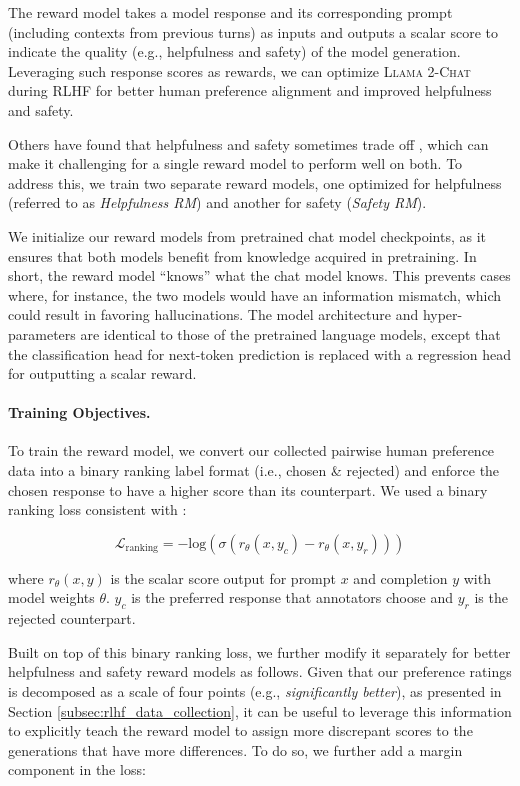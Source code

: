 The reward model takes a model response and its corresponding prompt (including contexts from previous turns) as inputs and outputs a scalar score to indicate the quality (e.g., helpfulness and safety) of the model generation. Leveraging such response scores as rewards, we can optimize \textsc{Llama 2-Chat} during RLHF for better human preference alignment and improved helpfulness and safety. 

Others have found that helpfulness and safety sometimes trade off \citep{bai2022training}, which can make it challenging for a single reward model to perform well on both. To address this, we train two separate reward models, one optimized for helpfulness (referred to as \textit{Helpfulness RM}) and another for safety (\textit{Safety RM}).

We initialize our reward models from pretrained chat model checkpoints, as it ensures that both models benefit from knowledge acquired in pretraining. In short, the reward model ``knows'' what the chat model knows. This prevents cases where, for instance, the two models would have an information mismatch, which could result in favoring hallucinations. The model architecture and hyper-parameters are identical to those of the pretrained language models, except that the classification head for next-token prediction is replaced with a regression head for outputting a scalar reward. 

\paragraph{Training Objectives.} To train the reward model, we convert our collected pairwise human preference data into a binary ranking label format (i.e., chosen \& rejected) and enforce the chosen response to have a higher score than its counterpart. We used a binary ranking loss consistent with \cite{ouyang2022training}:

\begin{equation}
\mathcal{L}_{\text{ranking}} = -\text{log}(\sigma(r_\theta(x,y_{c}) - r_\theta(x,y_{r})))
\label{eq:rating_loss_default}
\end{equation}

where $r_\theta(x, y)$ is the scalar score output for prompt $x$ and completion $y$ with model weights $\theta$. $y_{c}$ is the preferred response that annotators choose and $y_{r}$ is the rejected counterpart. 

Built on top of this binary ranking loss, we further modify it separately for better helpfulness and safety reward models as follows. Given that our preference ratings is decomposed as a scale of four points (e.g., \textit{significantly better}), as presented in Section \ref{subsec:rlhf_data_collection}, it can be useful to leverage this information to explicitly teach the reward model to assign more discrepant scores to the generations that have more differences. To do so, we further add a margin component in the loss:

